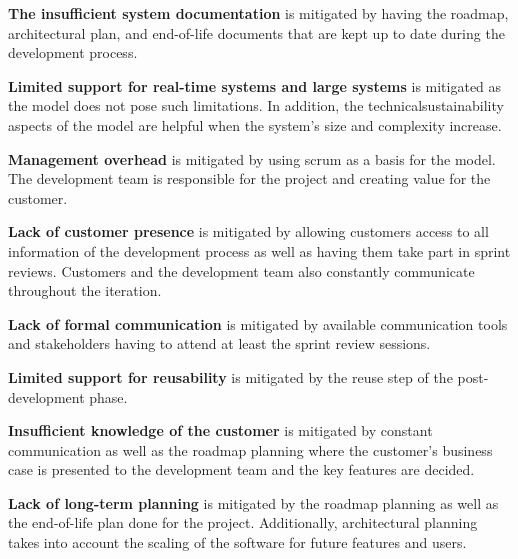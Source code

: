 \textbf{The insufficient system documentation} is mitigated by having the roadmap, architectural plan, and end-of-life documents that are kept up to date during the development process.

\textbf{Limited support for real-time systems and large systems} is mitigated as the model does not pose such limitations. In addition, the \gls{technicalsustainability} aspects of the model are helpful when the system's size and complexity increase.

\textbf{Management overhead} is mitigated by using scrum as a basis for the model. The development team is responsible for the project and creating value for the customer.

\textbf{Lack of customer presence} is mitigated by allowing customers access to all information of the development process as well as having them take part in sprint reviews. Customers and the development team also constantly communicate throughout the iteration.

\textbf{Lack of formal communication} is mitigated by available communication tools and stakeholders having to attend at least the sprint review sessions.

\textbf{Limited support for reusability} is mitigated by the reuse step of the post-development phase.

\textbf{Insufficient knowledge of the customer} is mitigated by constant communication as well as the roadmap planning where the customer's business case is presented to the development team and the key features are decided.

\textbf{Lack of long-term planning} is mitigated by the roadmap planning as well as the end-of-life plan done for the project. Additionally, architectural planning takes into account the scaling of the software for future features and users.

